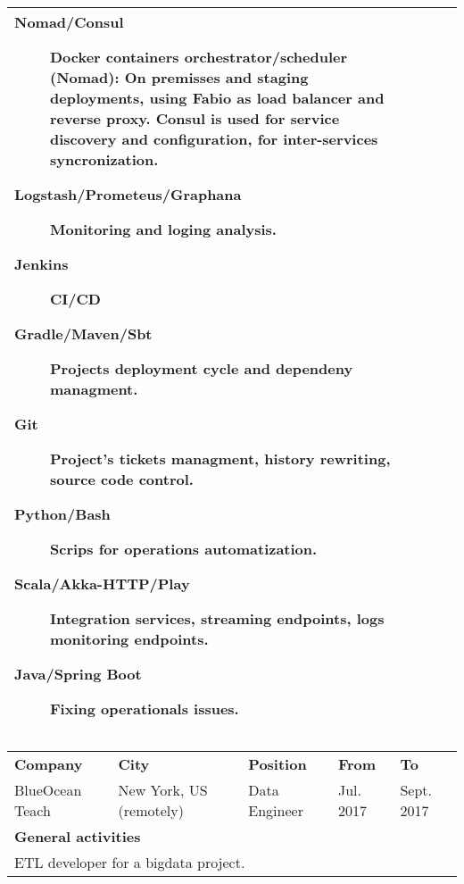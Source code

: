 \begin{cventries}
\begin{tabular}{|p{4.5cm} p{2cm} p{4cm} p{2cm} p{2cm}|}
{\begin{description}
                        \item[Nomad/Consul] Docker containers orchestrator/scheduler (Nomad): On premisses and staging deployments, using Fabio as load balancer and reverse proxy. Consul is used for service discovery and configuration, for inter-services syncronization.

                        \item[Logstash/Prometeus/Graphana] Monitoring and loging analysis.

                        \item[Jenkins] CI/CD

                        \item[Gradle/Maven/Sbt] Projects deployment cycle and dependeny managment.
                        \item[Git] Project's tickets managment, history rewriting, source code control.

                        \item[Python/Bash] Scrips for operations automatization.

                        \item[Scala/Akka-HTTP/Play] Integration services, streaming endpoints, logs monitoring endpoints.

                        \item[Java/Spring Boot] Fixing operationals issues.

                       \end{description}
      } \\
 

    \hline

  \end{tabular}



  \begin{tabular}{|p{4.5cm} p{2cm} p{4cm} p{2cm} p{2cm}|}
    \hline
    \textbf{Company} & 
    \textbf{City} & 
    \textbf{Position} & 
    \textbf{From} & \textbf{To} \\
    BlueOcean Teach & 
    New York, US \hspace{1cm} (remotely) & 
    Data Engineer & 
    
    Jul. 2017 & Sept. 2017 \\ 

    \multicolumn{5}{|l|}{\textbf{General activities}} \\

     \multicolumn{5}{|p{15cm}|}{
       ETL developer for a bigdata project.
       } \\


\end{tabular}
\end{cventries}
